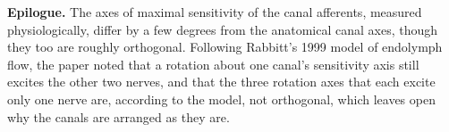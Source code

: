 \textbf{Epilogue.} The axes of maximal
sensitivity of the canal afferents, measured
physiologically, differ by a few degrees from
the anatomical canal axes, though they too
are roughly orthogonal. Following Rabbitt's
1999 model of endolymph flow, the paper noted
that a rotation about one canal's sensitivity
axis still excites the other two nerves, and
that the three rotation axes that each excite
only one nerve are, according to the model,
not orthogonal, which leaves open why the
canals are arranged as they are.





